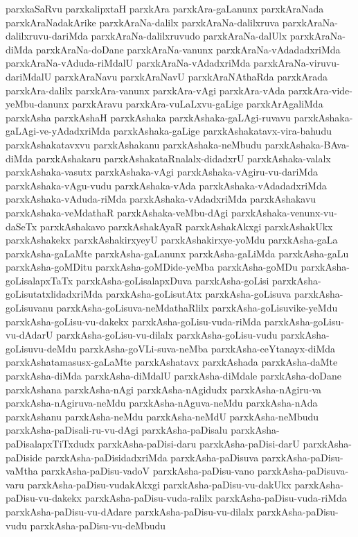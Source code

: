 {parxkaSaRvu
parxkalipxtaH
parxkAra
parxkAra-gaLanunx
parxkAraNada
parxkAraNadakArike
parxkAraNa-dalilx
parxkAraNa-dalilxruva
parxkAraNa-dalilxruvu-dariMda
parxkAraNa-dalilxruvudo
parxkAraNa-dalUlx
parxkAraNa-diMda
parxkAraNa-doDane
parxkAraNa-vanunx
parxkAraNa-vAdadadxriMda
parxkAraNa-vAduda-riMdalU
parxkAraNa-vAdadxriMda
parxkAraNa-viruvu-dariMdalU
parxkAraNavu
parxkAraNavU
parxkAraNAthaRda
parxkArada
parxkAra-dalilx
parxkAra-vanunx
parxkAra-vAgi
parxkAra-vAda
parxkAra-vide-yeMbu-danunx
parxkAravu
parxkAra-vuLaLxvu-gaLige
parxkArAgaliMda
parxkAsha
parxkAshaH
parxkAshaka
parxkAshaka-gaLAgi-ruvavu
parxkAshaka-gaLAgi-ve-yAdadxriMda
parxkAshaka-gaLige
parxkAshakatavx-vira-bahudu
parxkAshakatavxvu
parxkAshakanu
parxkAshaka-neMbudu
parxkAshaka-BAva-diMda
parxkAshakaru
parxkAshakataRnalalx-didadxrU
parxkAshaka-valalx
parxkAshaka-vasutx
parxkAshaka-vAgi
parxkAshaka-vAgiru-vu-dariMda
parxkAshaka-vAgu-vudu
parxkAshaka-vAda
parxkAshaka-vAdadadxriMda
parxkAshaka-vAduda-riMda
parxkAshaka-vAdadxriMda
parxkAshakavu
parxkAshaka-veMdathaR
parxkAshaka-veMbu-dAgi
parxkAshaka-venunx-vu-daSeTx
parxkAshakavo
parxkAshakAyaR
parxkAshakAkxgi
parxkAshakUkx
parxkAshakekx
parxkAshakirxyeyU
parxkAshakirxye-yoMdu
parxkAsha-gaLa
parxkAsha-gaLaMte
parxkAsha-gaLanunx
parxkAsha-gaLiMda
parxkAsha-gaLu
parxkAsha-goMDitu
parxkAsha-goMDide-yeMba
parxkAsha-goMDu
parxkAsha-goLisalapxTaTx
parxkAsha-goLisalapxDuva
parxkAsha-goLisi
parxkAsha-goLisutatxlidadxriMda
parxkAsha-goLisutAtx
parxkAsha-goLisuva
parxkAsha-goLisuvanu
parxkAsha-goLisuva-neMdathaRlilx
parxkAsha-goLisuvike-yeMdu
parxkAsha-goLisu-vu-dakekx
parxkAsha-goLisu-vuda-riMda
parxkAsha-goLisu-vu-dAdarU
parxkAsha-goLisu-vu-dilalx
parxkAsha-goLisu-vudu
parxkAsha-goLisuvu-deMdu
parxkAsha-goVLi-suva-neMba
parxkAsha-ceYtanayx-diMda
parxkAshatamasusx-gaLaMte
parxkAshatavx
parxkAshada
parxkAsha-daMte
parxkAsha-diMda
parxkAsha-diMdalU
parxkAsha-diMdale
parxkAsha-doDane
parxkAshana
parxkAsha-nAgi
parxkAsha-nAgidudx
parxkAsha-nAgiru-va
parxkAsha-nAgiruva-neMdu
parxkAsha-nAguva-neMdu
parxkAsha-nAda
parxkAshanu
parxkAsha-neMdu
parxkAsha-neMdU
parxkAsha-neMbudu
parxkAsha-paDisali-ru-vu-dAgi
parxkAsha-paDisalu
parxkAsha-paDisalapxTiTxdudx
parxkAsha-paDisi-daru
parxkAsha-paDisi-darU
parxkAsha-paDiside
parxkAsha-paDisidadxriMda
parxkAsha-paDisuva
parxkAsha-paDisu-vaMtha
parxkAsha-paDisu-vadoV
parxkAsha-paDisu-vano
parxkAsha-paDisuva-varu
parxkAsha-paDisu-vudakAkxgi
parxkAsha-paDisu-vu-dakUkx
parxkAsha-paDisu-vu-dakekx
parxkAsha-paDisu-vuda-ralilx
parxkAsha-paDisu-vuda-riMda
parxkAsha-paDisu-vu-dAdare
parxkAsha-paDisu-vu-dilalx
parxkAsha-paDisu-vudu
parxkAsha-paDisu-vu-deMbudu
}
